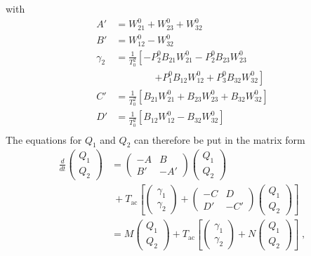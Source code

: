 \documentclass[pre,a4paper,twocolumn,superscriptaddress,%
floatfix]{revtex4}
\newcommand{\tac}{\ensuremath{T_{\mathrm{ac}}}}
\begin{document}
with
\begin{align}
  A' &= W_{21}^0 + W_{23}^0 + W_{32}^0 \nonumber\\
  B' &= W_{12}^0 - W_{32}^0 \nonumber\\
  \gamma_2 &= \frac{1}{T_0^2} \left[ -P_2^0 B_{21} W_{21}^0 - P_2^0 B_{23}
             W_{23}^0 \right. \nonumber \\
  & \qquad \qquad \left. + P_1^0 B_{12} W_{12}^0 + P_3^0 B_{32} W_{32}^0 \right]
  \nonumber \\
  C' &= \frac{1}{T_0^2} \left[ B_{21} W_{21}^0 + B_{23} W_{23}^0 + B_{32}
  W_{32}^0 \right] \nonumber \\
  D' &= \frac{1}{T_0^2} \left[B_{12} W_{12}^0 - B_{32} W_{32}^0 \right]
 \nonumber \\
\end{align}
The equations for $Q_1$ and $Q_2$ can therefore be put in the matrix form
\begin{align}
  \label{eq:qmatrix}
  \frac{d}{dt}
  \left( \begin{array}{c}Q_1 \\ Q_2 \end{array} \right)
  &=
    \left( \begin{array}{cc} -A & B \\ B' & -A' \end{array} \right)
   \left( \begin{array}{c}Q_1 \\ Q_2 \end{array} \right)
 \nonumber \\ &~ + \tac \left[ 
 \left( \begin{array}{c}\gamma_1 \\ \gamma_2 \end{array} \right)
 + \left( \begin{array}{cc} -C & D \\ D' & -C' \end{array} \right)
 \left( \begin{array}{c}Q_1 \\ Q_2 \end{array} \right) \right]
\nonumber \\
  &= M  \left( \begin{array}{c}Q_1 \\ Q_2 \end{array} \right) +
\tac \left[ \left( \begin{array}{c}\gamma_1 \\ \gamma_2 \end{array} \right)
+ N \left( \begin{array}{c}Q_1 \\ Q_2 \end{array} \right) \right] \;,
\end{align}
\end{document}
